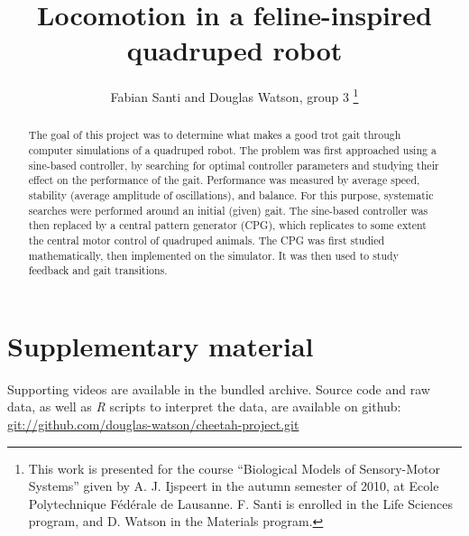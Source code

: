 \documentclass[a4paper, 10pt, conference]{ieeeconf}      %
\title{\LARGE \bf
Locomotion in a feline-inspired quadruped robot
}
\author{Fabian Santi and Douglas Watson, group 3%
\thanks{This work is presented for the course ``Biological Models of 
Sensory-Motor Systems'' given by A. J. Ijspeert in the autumn semester of 2010, 
at Ecole Polytechnique Fédérale de Lausanne.  F. Santi is enrolled in the Life 
Sciences program, and D. Watson in the Materials program.}%
}
\begin{document}
\newcommand{\order}[1]{$\cdot 10^{#1}$}
\newcommand{\pvalue}[2]{p-value $< #1 \cdot 10^{#2}$}

\maketitle
\thispagestyle{fancyplain}


\begin{abstract}
The goal of this project was to determine what makes a good trot gait through 
computer simulations of a quadruped robot. The problem was first approached 
using a sine-based controller, by searching for optimal controller parameters 
and studying their effect on the performance of the gait. Performance was 
measured by average speed, stability (average amplitude of oscillations), and 
balance. For this purpose, systematic searches were performed around an initial 
(given) gait. The sine-based controller was then replaced by a central pattern 
generator (CPG), which replicates to some extent the central motor control of 
quadruped animals. The CPG was first studied mathematically, then implemented 
on the simulator. It was then used to study feedback and gait transitions.

\end{abstract}



\setcounter{tocdepth}{2}
\tableofcontents





\clearpage

\clearpage



\section*{Supplementary material}
\label{sec:supplementary-material}

Supporting videos are available in the bundled archive. Source code and raw 
data, as well as \textsl{R} scripts to interpret the data, are available on 
github: \url{git://github.com/douglas-watson/cheetah-project.git}

\nocite{*}


\end{document}
